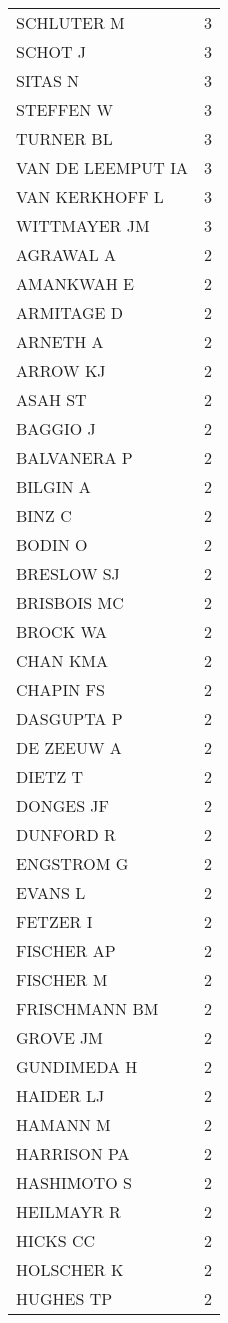 \documentclass[]{article}
\begin{document}
\begin{longtable}{lc}
SCHLUTER M & 3 \\ 
SCHOT J & 3 \\ 
SITAS N & 3 \\ 
STEFFEN W & 3 \\ 
TURNER BL & 3 \\ 
VAN DE LEEMPUT IA & 3 \\ 
VAN KERKHOFF L & 3 \\ 
WITTMAYER JM & 3 \\ 
AGRAWAL A & 2 \\ 
AMANKWAH E & 2 \\ 
ARMITAGE D & 2 \\ 
ARNETH A & 2 \\ 
ARROW KJ & 2 \\ 
ASAH ST & 2 \\ 
BAGGIO J & 2 \\ 
BALVANERA P & 2 \\ 
BILGIN A & 2 \\ 
BINZ C & 2 \\ 
BODIN O & 2 \\ 
BRESLOW SJ & 2 \\ 
BRISBOIS MC & 2 \\ 
BROCK WA & 2 \\ 
CHAN KMA & 2 \\ 
CHAPIN FS & 2 \\ 
DASGUPTA P & 2 \\ 
DE ZEEUW A & 2 \\ 
DIETZ T & 2 \\ 
DONGES JF & 2 \\ 
DUNFORD R & 2 \\ 
ENGSTROM G & 2 \\ 
EVANS L & 2 \\ 
FETZER I & 2 \\ 
FISCHER AP & 2 \\ 
FISCHER M & 2 \\ 
FRISCHMANN BM & 2 \\ 
GROVE JM & 2 \\ 
GUNDIMEDA H & 2 \\ 
HAIDER LJ & 2 \\ 
HAMANN M & 2 \\ 
HARRISON PA & 2 \\ 
HASHIMOTO S & 2 \\ 
HEILMAYR R & 2 \\ 
HICKS CC & 2 \\ 
HOLSCHER K & 2 \\ 
HUGHES TP & 2 \\ 

\end{longtable}
\end{document}
